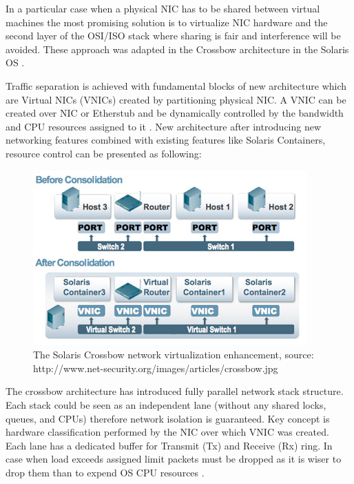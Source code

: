 \documentclass[11pt]{book}
\begin{document}
        In a particular case when a physical NIC has to be shared between virtual machines the most promising solution is
        to virtualize NIC hardware and the second layer of the OSI/ISO stack where sharing is fair and interference
        will be avoided. These approach was adapted in the Crossbow architecture in the Solaris OS \cite{crossbow}.
        
        Traffic separation is achieved with fundamental blocks of new architecture which are Virtual NICs (VNICs)
        created by partitioning physical NIC. A VNIC can be created over NIC or Etherstub and
        be dynamically controlled by the bandwidth and CPU resources assigned to it
        \cite{crossbow,network_virtualization}. New architecture after introducing new networking features combined with
        existing features like Solaris Containers, resource control can be presented as following:

        \begin{figure}[H]
          \begin{center}
            \includegraphics[width=.7\textwidth]{img/crossbow.jpg}
          \end{center}

          \caption{The Solaris Crossbow network virtualization enhancement, source: http://www.net-security.org/images/articles/crossbow.jpg}
        \end{figure}

        The crossbow architecture has introduced fully parallel network stack structure. Each stack could be seen as
        an independent lane (without any shared locks, queues, and CPUs) therefore network isolation is guaranteed.
        Key concept is hardware classification performed by the NIC over which VNIC was created.  Each lane has a
        dedicated buffer for Transmit (Tx) and Receive (Rx) ring. In case when load exceeds assigned limit packets must
        be dropped as it is wiser to drop them than to expend OS CPU resources \cite{crossbow}.
\end{document}
